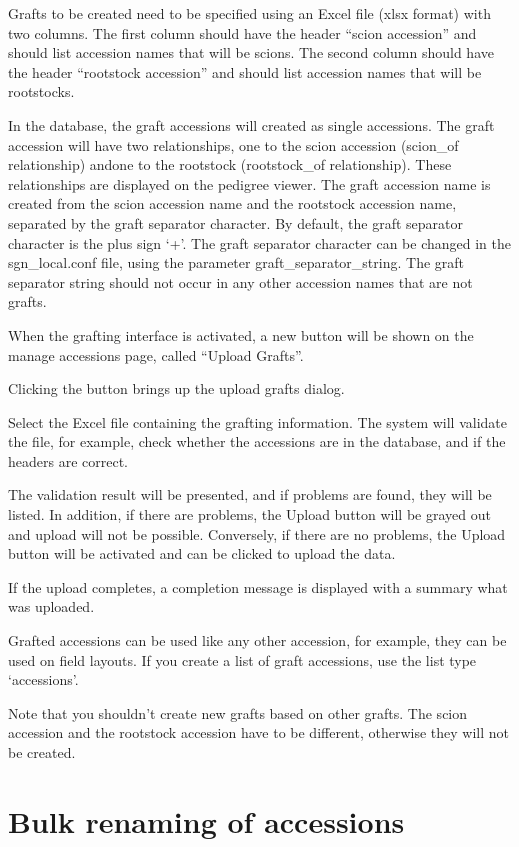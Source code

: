 \documentclass[
  12pt,
]{book}
\begin{document}
Grafts to be created need to be specified using an Excel file (xlsx format) with two columns. The first column should have the header ``scion accession'' and should list accession names that will be scions. The second column should have the header ``rootstock accession'' and should list accession names that will be rootstocks.

In the database, the graft accessions will created as single accessions. The graft accession will have two relationships, one to the scion accession (scion\_of relationship) andone to the rootstock (rootstock\_of relationship). These relationships are displayed on the pedigree viewer. The graft accession name is created from the scion accession name and the rootstock accession name, separated by the graft separator character. By default, the graft separator character is the plus sign `+'. The graft separator character can be changed in the sgn\_local.conf file, using the parameter graft\_separator\_string. The graft separator string should not occur in any other accession names that are not grafts.

When the grafting interface is activated, a new button will be shown on the manage accessions page, called ``Upload Grafts''.

Clicking the button brings up the upload grafts dialog.

Select the Excel file containing the grafting information. The system will validate the file, for example, check whether the accessions are in the database, and if the headers are correct.

The validation result will be presented, and if problems are found, they will be listed. In addition, if there are problems, the Upload button will be grayed out and upload will not be possible. Conversely, if there are no problems, the Upload button will be activated and can be clicked to upload the data.

If the upload completes, a completion message is displayed with a summary what was uploaded.

Grafted accessions can be used like any other accession, for example, they can be used on field layouts. If you create a list of graft accessions, use the list type `accessions'.

Note that you shouldn't create new grafts based on other grafts. The scion accession and the rootstock accession have to be different, otherwise they will not be created.

\hypertarget{bulk-renaming-of-accessions}{%
\section{Bulk renaming of accessions}\label{bulk-renaming-of-accessions}}
\end{document}

